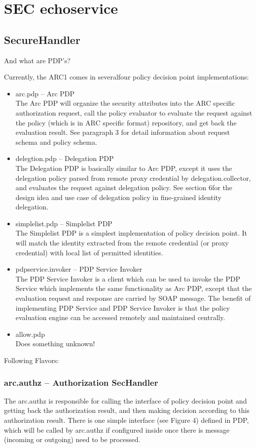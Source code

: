 

\chapter{SEC echoservice}

\section{SecureHandler}
And what are PDP's?

Currently, the ARC1 comes in severalfour policy decision point implementations:
\begin{itemize}
 \item arc.pdp – Arc PDP\\
The Arc PDP will organize the security attributes into the ARC specific authorization request, call the
policy evaluator to evaluate the request against the policy (which is in ARC specific format) repository,
and get back the evaluation result. See paragraph 3 for detail information about request schema and policy
schema.
\item delegtion.pdp – Delegation PDP\\
The Delegation PDP is basically similar to Arc PDP, except it uses the delegation policy parsed from
remote proxy credential by delegation.collector, and evaluates the request against delegation policy. See
section 6for the design idea and use case of delegation policy in fine-grained identity delegation.
\item simplelist.pdp – Simplelist PDP\\
The Simplelist PDP is a simplest implementation of policy decision point. It will match the identity
extracted from the remote credential (or proxy credential) with local list of permitted identities.
\item pdpservice.invoker – PDP Service Invoker\\
The PDP Service Invoker is a client which can be used to invoke the PDP Service which implements the
same functionality as Arc PDP, except that the evaluation request and response are carried by SOAP
message. The benefit of implementing PDP Service and PDP Service Invoker is that the policy evaluation
engine can be accessed remotely and maintained centrally.
 \item allow.pdp\\
 Does something unknown!
\end{itemize}

Following Flavors:
\subsection{arc.authz – Authorization SecHandler}
The arc.authz is responsible for calling the interface of policy decision point and getting back the
authorization result, and then making decision according to this authorization result. There is one simple
interface (see Figure 4) defined in PDP, which will be called by arc.authz if configured inside once there
is message (incoming or outgoing) need to be processed.

